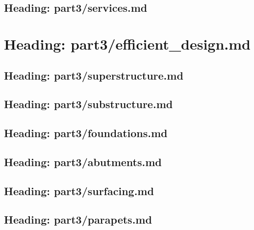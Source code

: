 \documentclass[letterpaper,10pt,english]{jupyterBook}
\begin{document}
\section{Heading: part3/services.md}
\label{\detokenize{part3/services:heading-part3-services-md}}\label{\detokenize{part3/services::doc}}
\sphinxstepscope


\chapter{Heading: part3/efficient\_design.md}
\label{\detokenize{part3/efficient_design:heading-part3-efficient-design-md}}\label{\detokenize{part3/efficient_design::doc}}
\sphinxstepscope


\section{Heading: part3/superstructure.md}
\label{\detokenize{part3/superstructure:heading-part3-superstructure-md}}\label{\detokenize{part3/superstructure::doc}}
\sphinxstepscope


\section{Heading: part3/substructure.md}
\label{\detokenize{part3/substructure:heading-part3-substructure-md}}\label{\detokenize{part3/substructure::doc}}
\sphinxstepscope


\section{Heading: part3/foundations.md}
\label{\detokenize{part3/foundations:heading-part3-foundations-md}}\label{\detokenize{part3/foundations::doc}}
\sphinxstepscope


\section{Heading: part3/abutments.md}
\label{\detokenize{part3/abutments:heading-part3-abutments-md}}\label{\detokenize{part3/abutments::doc}}
\sphinxstepscope


\section{Heading: part3/surfacing.md}
\label{\detokenize{part3/surfacing:heading-part3-surfacing-md}}\label{\detokenize{part3/surfacing::doc}}
\sphinxstepscope


\section{Heading: part3/parapets.md}
\label{\detokenize{part3/parapets:heading-part3-parapets-md}}\label{\detokenize{part3/parapets::doc}}
\sphinxstepscope
\end{document}
